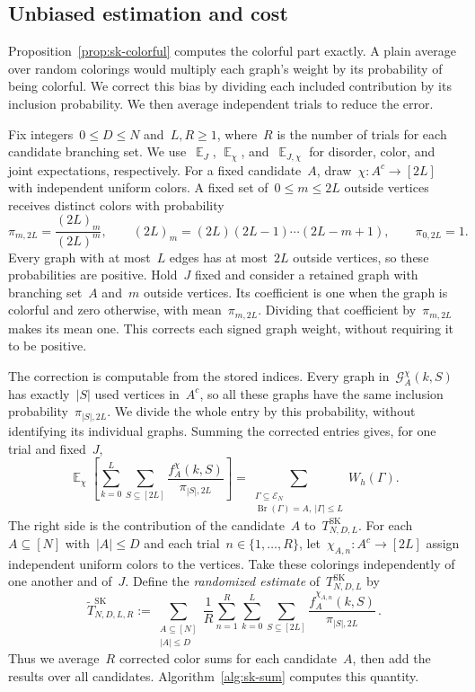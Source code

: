 \documentclass[letterpaper,11pt,reqno]{amsart}
\renewcommand{\leq}{\leqslant}
\renewcommand{\geq}{\geqslant}
\DeclareMathOperator{\E}{\mathds{E}}
\DeclareMathOperator{\Br}{Br}
\begin{document}
\subsection{Unbiased estimation and cost}\label{subsec:sk-estimator}

Proposition~\ref{prop:sk-colorful} computes the colorful part exactly. A plain average over random colorings would multiply each graph's weight by its probability of being colorful. We correct this bias by dividing each included contribution by its inclusion probability. We then average independent trials to reduce the error.

Fix integers~$0\leq D\leq N$ and~$L,R\geq1$, where~$R$ is the number of trials for each candidate branching set. We use~$\E_J$, $\E_\chi$, and~$\E_{J,\chi}$ for disorder, color, and joint expectations, respectively. For a fixed candidate~$A$, draw~$\chi:A^c\to[2L]$ with independent uniform colors. A fixed set of~$0\leq m\leq2L$ outside vertices receives distinct colors with probability
\begin{equation}\label{eq:color-inclusion}
\pi_{m,2L}=\frac{(2L)_m}{(2L)^m},\qquad
(2L)_m=(2L)(2L-1)\cdots(2L-m+1),\qquad \pi_{0,2L}=1.
\end{equation}
Every graph with at most~$L$ edges has at most~$2L$ outside vertices, so these probabilities are positive. Hold~$J$ fixed and consider a retained graph with branching set~$A$ and~$m$ outside vertices. Its coefficient is one when the graph is colorful and zero otherwise, with mean~$\pi_{m,2L}$. Dividing that coefficient by~$\pi_{m,2L}$ makes its mean one. This corrects each signed graph weight, without requiring it to be positive.

The correction is computable from the stored indices. Every graph in~$\mathcal G_A^\chi(k,S)$ has exactly~$|S|$ used vertices in~$A^c$, so all these graphs have the same inclusion probability~$\pi_{|S|,2L}$. We divide the whole entry by this probability, without identifying its individual graphs. Summing the corrected entries gives, for one trial and fixed~$J$,
\begin{equation*}
\E_\chi\!\left[\sum_{k=0}^{L}\sum_{S\subseteq[2L]}
\frac{f_A^\chi(k,S)}{\pi_{|S|,2L}}\right]
=\sum_{\substack{\Gamma\subseteq\mathcal E_N\\\Br(\Gamma)=A,\ |\Gamma|\leq L}}W_h(\Gamma).
\end{equation*}
The right side is the contribution of the candidate~$A$ to~$T^{\mathrm{SK}}_{N,D,L}$. For each~$A\subseteq[N]$ with~$|A|\leq D$ and each trial~$n\in\{1,\ldots,R\}$, let~$\chi_{A,n}:A^c\to[2L]$ assign independent uniform colors to the vertices. Take these colorings independently of one another and of~$J$. Define the \emph{randomized estimate} of~$T^{\mathrm{SK}}_{N,D,L}$ by
\begin{equation}\label{eq:sk-estimator-definition}
\widetilde T^{\mathrm{SK}}_{N,D,L,R}
:=\sum_{\substack{A\subseteq[N]\\|A|\leq D}}
\frac1R\sum_{n=1}^{R}\sum_{k=0}^{L}\sum_{S\subseteq[2L]}
\frac{f_A^{\chi_{A,n}}(k,S)}{\pi_{|S|,2L}}\,.
\end{equation}
Thus we average~$R$ corrected color sums for each candidate~$A$, then add the results over all candidates. Algorithm~\ref{alg:sk-sum} computes this quantity.
\end{document}
